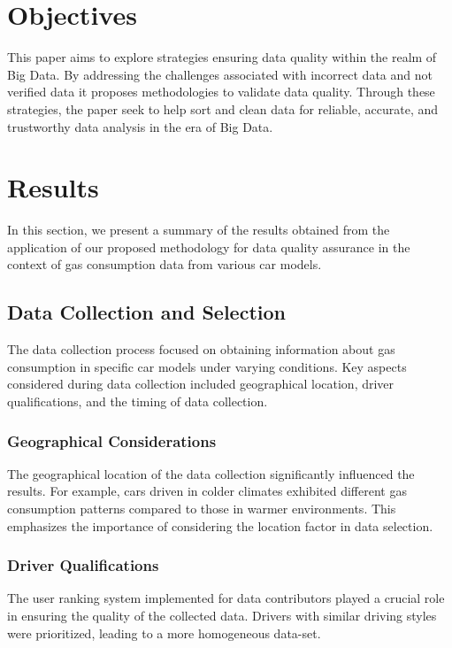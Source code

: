 \documentclass[10pt,a4paper]{article}
\begin{document}
\section{Objectives}
This paper aims to explore strategies ensuring data quality within the realm of Big Data. By addressing the challenges associated with incorrect data and not verified data it proposes methodologies to validate data quality. Through these strategies, the paper seek to help sort and clean data for reliable, accurate, and trustworthy data analysis in the era of Big Data.

\section{Results}

In this section, we present a summary of the results obtained from the application of our proposed methodology for data quality assurance in the context of gas consumption data from various car models.



\subsection{Data Collection and Selection}

The data collection process focused on obtaining information about gas consumption in specific car models under varying conditions. Key aspects considered during data collection included geographical location, driver qualifications, and the timing of data collection.

\subsubsection{Geographical Considerations}

The geographical location of the data collection significantly influenced the results. For example, cars driven in colder climates exhibited different gas consumption patterns compared to those in warmer environments. This emphasizes the importance of considering the location factor in data selection.

\subsubsection{Driver Qualifications}

The user ranking system implemented for data contributors played a crucial role in ensuring the quality of the collected data. Drivers with similar driving styles were prioritized, leading to a more homogeneous data-set.
\end{document}
